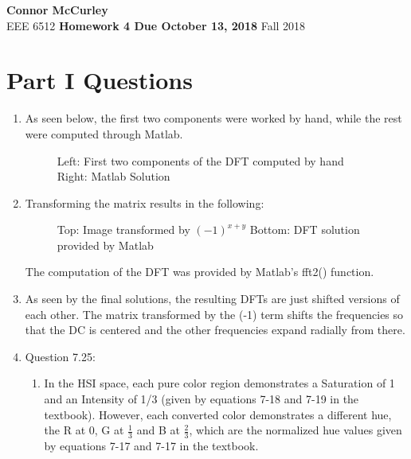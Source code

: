 \documentclass{article}[12 pt]
\begin{document}
	
\begin{center}
	\textbf{\Large Connor McCurley} \\
	EEE 6512 \qquad \textbf{\large Homework 4 Due October 13, 2018} \qquad Fall 2018 
\end{center}

\section*{Part I Questions}

\begin{enumerate}
\item As seen below, the first two components were worked by hand, while the rest were computed through Matlab.

\begin{figure}[H]
\captionsetup[subfloat]{labelformat=empty}
\centering
{}
\newline
{}
\caption{Left: First two components of the DFT computed by hand Right: Matlab Solution}
\end{figure}

\item Transforming the matrix results in the following:

\begin{figure}[H]
\captionsetup[subfloat]{labelformat=empty}
\centering
{}
\newline
{}
\caption{Top: Image transformed by $(-1)^{x+y}$ Bottom: DFT solution provided by Matlab}
\end{figure}

The computation of the DFT was provided by Matlab's fft2() function.

\item As seen by the final solutions, the resulting DFTs are just shifted versions of each other.  The matrix transformed by the (-1) term shifts the frequencies so that the DC is centered and the other frequencies expand radially from there.

\item Question 7.25:
	\begin{enumerate}[label=\alph*]
		\item In the HSI space, each pure color region demonstrates a Saturation of 1 and an Intensity of 1/3 (given by equations 7-18 and 7-19 in the textbook).  However, each converted color demonstrates a different hue, the R at 0, G at $\frac{1}{3}$ and B at $\frac{2}{3}$, which are the normalized hue values given by equations 7-17 and 7-17 in the textbook.


\end{enumerate}
\end{enumerate}
\end{document}
